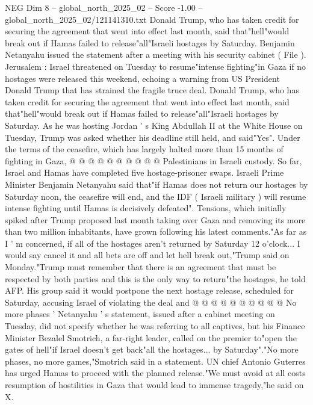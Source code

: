 \begin{textsample}{NEG Dim 8 – global\_north\_2025\_02 – Score -1.00 – global\_north\_2025\_02/121141310.txt}  \label{ex:f8_neg_429}
Donald Trump, who has taken credit for securing the agreement that went into effect last month, said that"hell"would break out if Hamas failed to release"all"Israeli hostages by Saturday.
Benjamin Netanyahu issued the statement after a meeting with his security cabinet ( File ).
Jerusalem : Israel threatened on Tuesday to resume"intense fighting"in Gaza if no hostages were released this weekend, echoing a warning from US President Donald Trump that has strained the fragile truce deal.
Donald Trump, who has taken credit for securing the agreement that went into effect last month, said that"hell"would break out if Hamas failed to release"all"Israeli hostages by Saturday.
As he was hosting Jordan ' s King Abdullah II at the White House on Tuesday, Trump was asked whether his deadline still held, and said"Yes".
Under the terms of the ceasefire, which has largely halted more than 15 months of fighting in Gaza, @ @ @ @ @ @ @ @ @ @ Palestinians in Israeli custody.
So far, Israel and Hamas have completed five hostage-prisoner swaps.
Israeli Prime Minister Benjamin Netanyahu said that"if Hamas does not return our hostages by Saturday noon, the ceasefire will end, and the IDF ( Israeli military ) will resume intense fighting until Hamas is decisively defeated".
Tensions, which initially spiked after Trump proposed last month taking over Gaza and removing its more than two million inhabitants, have grown following his latest comments."As far as I ' m concerned, if all of the hostages aren't returned by Saturday 12 o'clock...
I would say cancel it and all bets are off and let hell break out,"Trump said on Monday."Trump must remember that there is an agreement that must be respected by both parties and this is the only way to return"the hostages, he told AFP.
His group said it would postpone the next hostage release, scheduled for Saturday, accusing Israel of violating the deal and @ @ @ @ @ @ @ @ @ @ No more phases ' Netanyahu ' s statement, issued after a cabinet meeting on Tuesday, did not specify whether he was referring to all captives, but his Finance Minister Bezalel Smotrich, a far-right leader, called on the premier to"open the gates of hell"if Israel doesn't get back"all the hostages... by Saturday"."No more phases, no more games,"Smotrich said in a statement.
UN chief Antonio Guterres has urged Hamas to proceed with the planned release."We must avoid at all costs resumption of hostilities in Gaza that would lead to immense tragedy,"he said on X.

\end{textsample}
